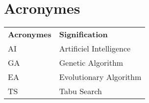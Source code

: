 \chapter*{Acronymes}

\begin{tabular}{l  l }
    

\textbf{Acronymes} & \textbf{Signification} \\



AI &  Artificiel Intelligence \\


GA & Genetic Algorithm\\

EA & Evolutionary Algorithm \\

TS & Tabu Search \\ 

\end{tabular}
